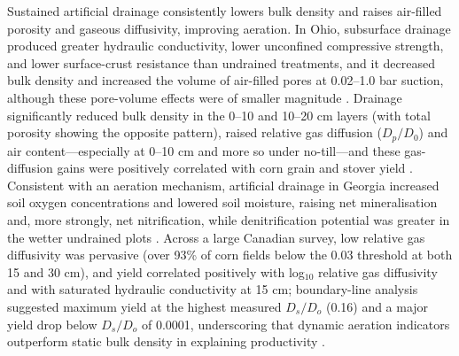 \documentclass[11pt]{article}
\begin{document}
Sustained artificial drainage consistently lowers bulk density and raises air-filled
porosity and gaseous diffusivity, improving aeration. In Ohio, subsurface drainage
produced greater hydraulic conductivity, lower unconfined compressive strength, and
lower surface-crust resistance than undrained treatments, and it decreased bulk
density and increased the volume of air-filled pores at 0.02--1.0 bar suction,
although these pore-volume effects were of smaller magnitude \parencite{HUNDAL1976}.
Drainage significantly reduced bulk density in the 0--10 and 10--20 cm layers (with
total porosity showing the opposite pattern), raised relative gas diffusion
($D_p/D_0$) and air content---especially at 0--10 cm and more so under no-till---and
these gas-diffusion gains were positively correlated with corn grain and stover yield
\parencite{Nakajima2014}. Consistent with an aeration mechanism, artificial drainage
in Georgia increased soil oxygen concentrations and lowered soil moisture, raising net
mineralisation and, more strongly, net nitrification, while denitrification potential
was greater in the wetter undrained plots \parencite{GROFFMAN1984}. Across a large
Canadian survey, low relative gas diffusivity was pervasive (over 93\% of corn fields
below the 0.03 threshold at both 15 and 30 cm), and yield correlated positively with
log$_{10}$ relative gas diffusivity and with saturated hydraulic conductivity at 15
cm; boundary-line analysis suggested maximum yield at the highest measured $D_s/D_o$
(0.16) and a major yield drop below $D_s/D_o$ of 0.0001, underscoring that dynamic
aeration indicators outperform static bulk density in explaining productivity
\parencite{Caron2025}.
\end{document}

